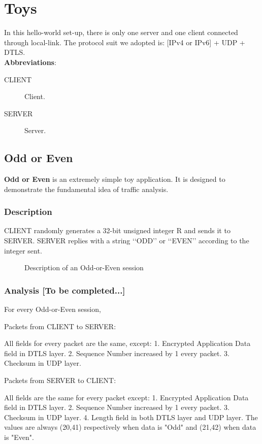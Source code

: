 \chapter{Toys}

In this hello-world set-up, there is only one server and one client connected through local-link. The protocol suit we adopted is: [IPv4 or IPv6] + UDP + DTLS.  
\\
\textbf{Abbreviations}:
\begin{description}
\item[CLIENT] Client.
\item[SERVER] Server.
\end{description}



\section{Odd or Even}
\textbf{Odd or Even} is an extremely simple toy application. It is designed to demonstrate the fundamental idea of traffic analysis.

\subsection{Description}
CLIENT randomly generates a 32-bit unsigned integer R and sends it to SERVER. SERVER replies with a string \lq\lq{}ODD\rq\rq{} or \lq\lq{}EVEN\rq\rq{} according to the integer sent.

\begin{figure}[H] \label{Fig:Odd or Even}
\caption{Description of an Odd-or-Even session}
\centering
\resizebox{8cm}{!}
{}
\end{figure}

\subsection{Analysis [To be completed...]}

For every Odd-or-Even session, 

Packets from CLIENT to SERVER:

All fields for every packet are the same, except:
1. Encrypted Application Data field in DTLS layer.
2. Sequence Number increased by 1 every packet.
3. Checksum in UDP layer.

Packets from SERVER to CLIENT:

All fields are the same for every packet except:
1. Encrypted Application Data field in DTLS layer.
2. Sequence Number increased by 1 every packet.
3. Checksum in UDP layer.
4. Length field in both DTLS layer and UDP layer. The values are always (20,41) respectively when data is "Odd" and (21,42) when data is "Even".

